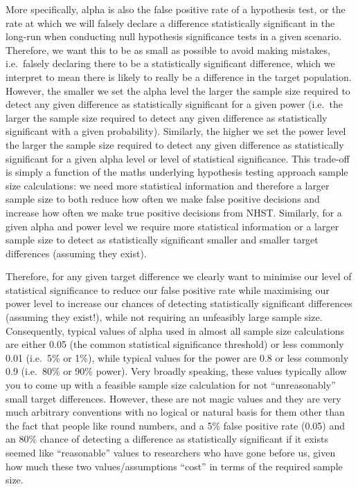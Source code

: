 \documentclass[
]{book}
\begin{document}
More specifically, alpha is also the false positive rate of a hypothesis test, or the rate at which we will falsely declare a difference statistically significant in the long-run when conducting null hypothesis significance tests in a given scenario. Therefore, we want this to be as small as possible to avoid making mistakes, i.e.~falsely declaring there to be a statistically significant difference, which we interpret to mean there is likely to really be a difference in the target population. However, the smaller we set the alpha level the larger the sample size required to detect any given difference as statistically significant for a given power (i.e.~the larger the sample size required to detect any given difference as statistically significant with a given probability). Similarly, the higher we set the power level the larger the sample size required to detect any given difference as statistically significant for a given alpha level or level of statistical significance. This trade-off is simply a function of the maths underlying hypothesis testing approach sample size calculations: we need more statistical information and therefore a larger sample size to both reduce how often we make false positive decisions and increase how often we make true positive decisions from NHST. Similarly, for a given alpha and power level we require more statistical information or a larger sample size to detect as statistically significant smaller and smaller target differences (assuming they exist).

Therefore, for any given target difference we clearly want to minimise our level of statistical significance to reduce our false positive rate while maximising our power level to increase our chances of detecting statistically significant differences (assuming they exist!), while not requiring an unfeasibly large sample size. Consequently, typical values of alpha used in almost all sample size calculations are either 0.05 (the common statistical significance threshold) or less commonly 0.01 (i.e.~5\% or 1\%), while typical values for the power are 0.8 or less commonly 0.9 (i.e.~80\% or 90\% power). Very broadly speaking, these values typically allow you to come up with a feasible sample size calculation for not ``unreasonably'' small target differences. However, these are not magic values and they are very much arbitrary conventions with no logical or natural basis for them other than the fact that people like round numbers, and a 5\% false positive rate (0.05) and an 80\% chance of detecting a difference as statistically significant if it exists seemed like ``reasonable'' values to researchers who have gone before us, given how much these two values/assumptions ``cost'' in terms of the required sample size.
\end{document}
